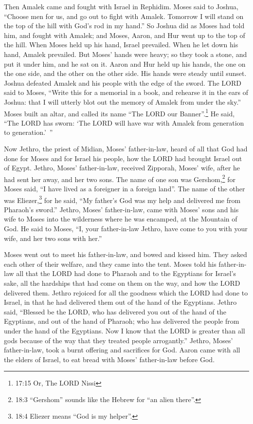\myverse{}Then Amalek came and fought with Israel in Rephidim.
\myverse{}Moses said to Joshua, “Choose men for us, and go out to fight with Amalek.
Tomorrow I will stand on the top of the hill with God’s rod in my hand.”
\myverse{}So Joshua did as Moses had told him, and fought with Amalek; and Moses, Aaron,
and Hur went up to the top of the hill.
\myverse{}When Moses held up his hand, Israel prevailed. When he let down his hand,
Amalek prevailed.
\myverse{}But Moses’ hands were heavy; so they took a stone, and put it under him,
and he sat on it. Aaron and Hur held up his hands, the one on the one side, and the other on the other
side. His hands were steady until sunset.
\myverse{}Joshua defeated Amalek and his people with the edge of the sword.
\myverse{}The LORD said to Moses, “Write this for a memorial in a book, and rehearse
it in the ears of Joshua: that I will utterly blot out the memory of Amalek from under the sky.”
\myverse{}Moses built an altar, and called its name “The LORD our Banner”.\footnote{17:15 Or, The LORD Nissi}
\myverse{}He said, “The LORD has sworn: ‘The LORD will have war with Amalek from generation
to generation.’ ”


\mychapter{} \myverse*{}Now Jethro, the priest of Midian, Moses’ father-in-law, heard
of all that God had done for Moses and for Israel his people, how the LORD had brought Israel out of Egypt.
\myverse{}Jethro, Moses’ father-in-law, received Zipporah, Moses’ wife, after he had
sent her away,
\myverse{}and her two sons. The name of one son was Gershom,\footnote{18:3 “Gershom” sounds like the Hebrew for “an alien there”.} for Moses said, “I have lived
as a foreigner in a foreign land”.
\myverse{}The name of the other was Eliezer,\footnote{18:4 Eliezer means “God is my helper”.} for he said, “My father’s God was my help and delivered me from Pharaoh’s sword.”
\myverse{}Jethro, Moses’ father-in-law, came with Moses’ sons and his wife to Moses into
the wilderness where he was encamped, at the Mountain of God.
\myverse{}He said to Moses, “I, your father-in-law Jethro, have come to you with your
wife, and her two sons with her.”


\myverse{}Moses went out to meet his father-in-law, and bowed and kissed
him. They asked each other of their welfare, and they came into the tent.
\myverse{}Moses told his father-in-law all that the LORD had done to Pharaoh and to the
Egyptians for Israel’s sake, all the hardships that had come on them on the way, and how the LORD delivered
them.
\myverse{}Jethro rejoiced for all the goodness which the LORD had done to Israel, in
that he had delivered them out of the hand of the Egyptians.
\myverse{}Jethro said, “Blessed be the LORD, who has delivered you out of the hand
of the Egyptians, and out of the hand of Pharaoh; who has delivered the people from under the hand of
the Egyptians.
\myverse{}Now I know that the LORD is greater than all gods because of the way that
they treated people arrogantly.”
\myverse{}Jethro, Moses’ father-in-law, took a burnt offering and sacrifices for God.
Aaron came with all the elders of Israel, to eat bread with Moses’ father-in-law before God.


